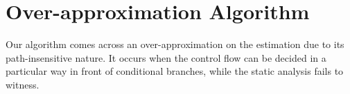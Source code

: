 %
%

\section{ Over-approximation Algorithm}
\label{sec:adapt-example-over}

Our algorithm comes across an over-approximation on the estimation due to its path-insensitive nature. It occurs when the control flow can be decided in a particular way in front of conditional branches, while the static analysis fails to witness. 

